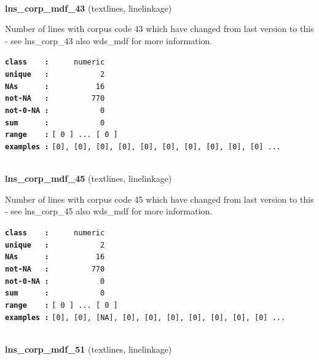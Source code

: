 \documentclass[]{article}
\begin{document}
~

\textbf{lns\_corp\_mdf\_43} (textlines, linelinkage)

Number of lines with corpus code 43 which have changed from last version
to this - see lns\_corp\_43 also wds\_mdf for more information.

\textbf{\texttt{class\ \ \ \ :}} \texttt{~~~~~numeric}\\
\textbf{\texttt{unique\ \ \ :}} \texttt{~~~~~~~~~~~2}\\
\textbf{\texttt{NAs\ \ \ \ \ \ :}} \texttt{~~~~~~~~~~16}\\
\textbf{\texttt{not-NA\ \ \ :}} \texttt{~~~~~~~~~770}\\
\textbf{\texttt{not-0-NA\ :}} \texttt{~~~~~~~~~~~0}\\
\textbf{\texttt{sum\ \ \ \ \ \ :}} \texttt{~~~~~~~~~~~0}\\
\textbf{\texttt{range\ \ \ \ :}}
\texttt{{[}\ 0\ {]}\ ...\ {[}\ 0\ {]}}\\
\textbf{\texttt{examples\ :}}
\texttt{{[}0{]},\ {[}0{]},\ {[}0{]},\ {[}0{]},\ {[}0{]},\ {[}0{]},\ {[}0{]},\ {[}0{]},\ {[}0{]},\ {[}0{]}\ ...}\\

~

\textbf{lns\_corp\_mdf\_45} (textlines, linelinkage)

Number of lines with corpus code 45 which have changed from last version
to this - see lns\_corp\_45 also wds\_mdf for more information.

\textbf{\texttt{class\ \ \ \ :}} \texttt{~~~~~numeric}\\
\textbf{\texttt{unique\ \ \ :}} \texttt{~~~~~~~~~~~2}\\
\textbf{\texttt{NAs\ \ \ \ \ \ :}} \texttt{~~~~~~~~~~16}\\
\textbf{\texttt{not-NA\ \ \ :}} \texttt{~~~~~~~~~770}\\
\textbf{\texttt{not-0-NA\ :}} \texttt{~~~~~~~~~~~0}\\
\textbf{\texttt{sum\ \ \ \ \ \ :}} \texttt{~~~~~~~~~~~0}\\
\textbf{\texttt{range\ \ \ \ :}}
\texttt{{[}\ 0\ {]}\ ...\ {[}\ 0\ {]}}\\
\textbf{\texttt{examples\ :}}
\texttt{{[}0{]},\ {[}0{]},\ {[}NA{]},\ {[}0{]},\ {[}0{]},\ {[}0{]},\ {[}0{]},\ {[}0{]},\ {[}0{]},\ {[}0{]}\ ...}\\

~

\textbf{lns\_corp\_mdf\_51} (textlines, linelinkage)
\end{document}
